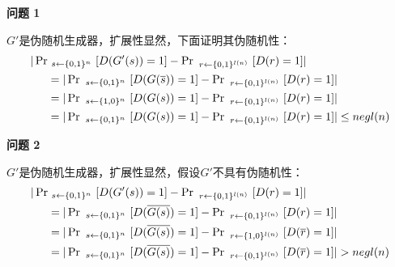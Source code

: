 \begin{questions}
        \begin{solution}
            \newline
            \begin{large}
                \textbf{问题 1}
            \end{large}
            \newline
            $G'$是伪随机生成器，扩展性显然，下面证明其伪随机性：
            \begin{equation}
                \begin{aligned}
                    |\Pr&\ _{s\leftarrow{\set{0,1}^n}}\ [D(G'(s))=1]-\Pr\ _{r\leftarrow{\set{0,1}^{l(n)}}}\ [D(r)=1]|\\
                    &=|\Pr\ _{s\leftarrow{\set{0,1}^n}}\ [D(G(\overline{s}))=1]-\Pr\ _{r\leftarrow{\set{0,1}^{l(n)}}}\ [D(r)=1]|\\
                    &=|\Pr\ _{s\leftarrow{\set{1,0}^n}}\ [D(G(s))=1]-\Pr\ _{r\leftarrow{\set{0,1}^{l(n)}}}\ [D(r)=1]|\\
                    &=|\Pr\ _{s\leftarrow{\set{0,1}^n}}\ [D(G(s))=1]-\Pr\ _{r\leftarrow{\set{0,1}^{l(n)}}}\ [D(r)=1]|\leq{negl}(n)
                \end{aligned}
            \end{equation}
            \newline
            \begin{large}
                \textbf{问题 2}
            \end{large}
            \newline
            $G'$是伪随机生成器，扩展性显然，假设$G'$不具有伪随机性：
            \begin{equation}
                \begin{aligned}
                    |\Pr&\ _{s\leftarrow{\set{0,1}^n}}\ [D(G'(s))=1]-\Pr\ _{r\leftarrow{\set{0,1}^{l(n)}}}\ [D(r)=1]|\\
                    &=|\Pr\ _{s\leftarrow{\set{0,1}^n}}\ [D(\overline{G(s)})=1]-\Pr\ _{r\leftarrow{\set{0,1}^{l(n)}}}\ [D(r)=1]|\\
                    &=|\Pr\ _{s\leftarrow{\set{0,1}^n}}\ [D(\overline{G(s)})=1]-\Pr\ _{r\leftarrow{\set{1,0}^{l(n)}}}\ [D(\overline{r})=1]|\\
                    &=|\Pr\ _{s\leftarrow{\set{0,1}^n}}\ [D(\overline{G(s)})=1]-\Pr\ _{r\leftarrow{\set{0,1}^{l(n)}}}\ [D(\overline{r})=1]|>{negl}(n)
                \end{aligned}
            \end{equation}

\end{solution}
\end{questions}
